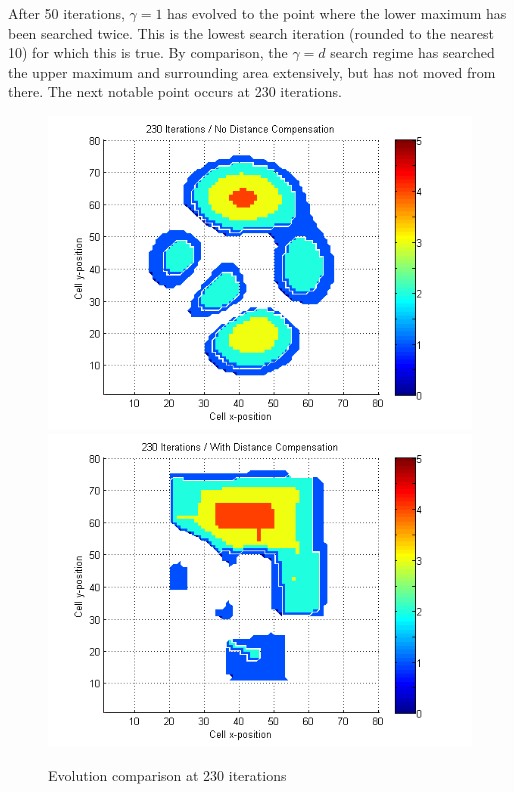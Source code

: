 \documentclass[a4paper]{article}
\begin{document}
After 50 iterations, $\gamma=1$ has evolved to the point where the lower maximum has been searched twice. This is the lowest search iteration (rounded to the nearest 10) for which this is true. By comparison, the $\gamma=d$ search regime has searched the upper maximum and surrounding area extensively, but has not moved from there. The next notable point occurs at 230 iterations.

\begin{figure}[H]\begin{center}
\includegraphics[scale=0.45]{../Matlab/Images/SearchCountNoDist230.png}
\includegraphics[scale=0.45]{../Matlab/Images/SearchCountDist230.png}
\caption{Evolution comparison at 230 iterations}
\end{center}\end{figure}
\end{document}
